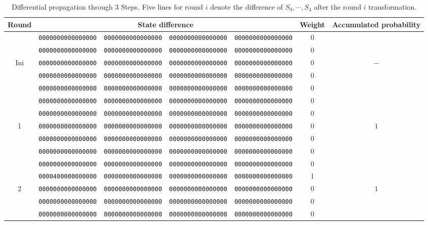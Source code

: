 \begin{table}[!tb]
\begin{center}
\caption{Differential propagation through 3 Steps. Five lines for round $i$ denote the difference of $S_0, \cdots, S_4$ after the round $i$ transformation.} %
\label{Tbl:fin_diff}
{\tiny
\begin{tabular}{ccccccc} \hline
Round & \multicolumn{4}{c}{State difference} & Weight & Accumulated probability \\ \hline
      & {\tt 0000000000000000} & {\tt 0000000000000000} & {\tt 0000000000000000} & {\tt 0000000000000000} & 0  & \\
      & {\tt 0000000000000000} & {\tt 0000000000000000} & {\tt 0000000000000000} & {\tt 0000000000000000} & 0  & \\
Ini   & {\tt 0000000000000000} & {\tt 0000000000000000} & {\tt 0000000000000000} & {\tt 0000000000000000} & 0  & $-$ \\
      & {\tt 0000000000000000} & {\tt 0000000000000000} & {\tt 0000000000000000} & {\tt 0000000000000000} & 0  & \\
      & {\tt 0000000000000000} & {\tt 0000000000000000} & {\tt 0000000000000000} & {\tt 0000000000000000} & 0  & \\ \hline

      & {\tt 0000000000000000} & {\tt 0000000000000000} & {\tt 0000000000000000} & {\tt 0000000000000000} & 0  & \\
      & {\tt 0000000000000000} & {\tt 0000000000000000} & {\tt 0000000000000000} & {\tt 0000000000000000} & 0  & \\
1     & {\tt 0000000000000000} & {\tt 0000000000000000} & {\tt 0000000000000000} & {\tt 0000000000000000} & 0  & $1$\\
      & {\tt 0000000000000000} & {\tt 0000000000000000} & {\tt 0000000000000000} & {\tt 0000000000000000} & 0  & \\
      & {\tt 0000000000000000} & {\tt 0000000000000000} & {\tt 0000000000000000} & {\tt 0000000000000000} & 0  & \\ \hline

      & {\tt 0000000000000000} & {\tt 0000000000000000} & {\tt 0000000000000000} & {\tt 0000000000000000} & 0  & \\
      & {\tt 0000400000000000} & {\tt 0000000000000000} & {\tt 0000000000000000} & {\tt 0000000000000000} & 1  & \\
2     & {\tt 0000000000000000} & {\tt 0000000000000000} & {\tt 0000000000000000} & {\tt 0000000000000000} & 0  & $1$\\
      & {\tt 0000000000000000} & {\tt 0000000000000000} & {\tt 0000000000000000} & {\tt 0000000000000000} & 0  & \\
      & {\tt 0000000000000000} & {\tt 0000000000000000} & {\tt 0000000000000000} & {\tt 0000000000000000} & 0  & \\ \hline


\end{tabular}}
\end{center}
\end{table}
